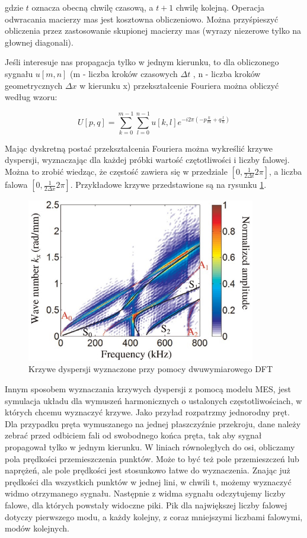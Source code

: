gdzie \( t \) oznacza obecną chwilę czasową, a \( t+1 \) chwilę kolejną.
Operacja odwracania macierzy mas jest kosztowna obliczeniowo. Można przyśpieszyć obliczenia przez zastosowanie skupionej macierzy mas (wyrazy niezerowe tylko na głownej diagonali).

Jeśli interesuje nas propagacja tylko w jednym kierunku, to dla obliczonego sygnału \( u[m, n] \) (m - liczba kroków czasowych \(\Delta t \) , n - liczba kroków geometrycznych \(\Delta x\) w kierunku x) przekształcenie Fouriera można obliczyć według wzoru:

\begin{equation} \label{eq:fourier_2d}
U[p, q] = \sum_{k=0}^{m-1} \sum_{l=0}^{n-1} u[k, l]e^{-i2\pi (-p \frac{k}{m} + q\frac{l}{n})}
\end{equation}

Mając dyskretną postać przekształcenia Fouriera można wykreślić krzywe dyspersji, wyznaczając dla każdej próbki wartość czętotliwości i liczby falowej. Można to zrobić wiedząc, że częstość zawiera się w przedziale \([0, \frac{1}{2\Delta t}2\pi]\), a liczba falowa \([0, \frac{1}{2\Delta x}2\pi]\). Przykładowe krzywe przedstawione są na rysunku \ref{fig:krzywe_dyspersji_tian1}.

\vspace{5mm}

\begin{figure}[h]
\centering
\includegraphics[width=10cm]{Zdjecia/2/dyspersja_tian1}
\caption{Krzywe dyspersji wyznaczone przy pomocy dwuwymiarowego DFT}
\label{fig:krzywe_dyspersji_tian1}
\end{figure}

Innym sposobem wyznaczania krzywych dyspersji z pomocą modelu MES, jest symulacja układu dla wymuszeń harmonicznych o ustalonych częstotliwościach, w których chcemu wyznaczyć krzywe. Jako przyład rozpatrzmy jednorodny pręt. Dla przypadku pręta wymuszanego na jednej płaszczyźnie przekroju, dane należy zebrać przed odbiciem fali od swobodnego końca pręta, tak aby sygnał propagował tylko w jednym kierunku. W liniach równoległych do osi, obliczamy pola prędkości przemieszczenia punktów. Może to być też pole przemieszczeń lub naprężeń, ale pole prędkości jest stosunkowo łatwe do wyznaczenia.
Znając już prędkości dla wszystkich punktów w jednej lini, w chwili t, możemy wyznaczyć widmo otrzymanego sygnału. Następnie z widma sygnału odczytujemy liczby falowe, dla których powstały widoczne piki. Pik dla największej liczby falowej dotyczy pierwszego modu, a każdy kolejny, z coraz mniejszymi liczbami falowymi, modów kolejnych.

